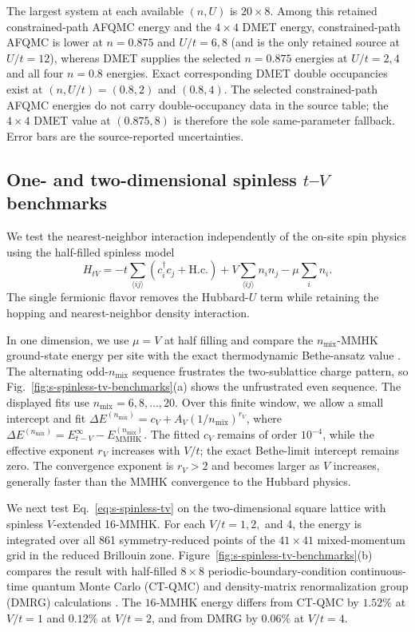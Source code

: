 \documentclass[10pt]{article}
\newcommand{\nmix}{n_{\mathrm{mix}}}
\begin{document}
The largest system at each available $(n,U)$ is $20\times8$. Among this retained
constrained-path AFQMC energy and the $4\times4$ DMET energy, constrained-path AFQMC is lower at
$n=0.875$ and $U/t=6,8$ (and is the only retained source at $U/t=12$), whereas
DMET supplies the selected $n=0.875$ energies at $U/t=2,4$ and all four
$n=0.8$ energies. Exact corresponding DMET double occupancies exist at
$(n,U/t)=(0.8,2)$ and $(0.8,4)$. The selected constrained-path AFQMC energies do not carry double-occupancy data in the source table; the $4\times4$ DMET value at $(0.875,8)$ is therefore the sole same-parameter fallback. Error bars are the source-reported uncertainties.

\subsection{One- and two-dimensional spinless $t$--$V$ benchmarks}
We test the nearest-neighbor interaction independently of the on-site spin physics using the half-filled spinless model
\begin{equation}
 H_{tV}=-t\sum_{\langle ij\rangle}\left(c_i^\dagger c_j+\mathrm{H.c.}\right)
 +V\sum_{\langle ij\rangle}n_i n_j-\mu\sum_i n_i .
 \label{eq:s-spinless-tv}
\end{equation}
The single fermionic flavor removes the Hubbard-$U$ term while retaining the hopping and nearest-neighbor density interaction.

In one dimension, we use $\mu=V$ at half filling and compare the $\nmix$-MMHK ground-state energy per site with the exact thermodynamic Bethe-ansatz value \cite{yang1966xxzenergy}. The alternating odd-$\nmix$ sequence frustrates the two-sublattice charge pattern, so Fig.~\ref{fig:s-spinless-tv-benchmarks}(a) shows the unfrustrated even sequence. The displayed fits use $\nmix=6,8,\ldots,20$. Over this finite window, we allow a small intercept and fit $\Delta E^{(\nmix)}=c_V+A_V(1/\nmix)^{r_V}$, where $\Delta E^{(\nmix)}=E_{t-V}^{\infty}-E_{\mathrm{MMHK}}^{(\nmix)}$. The fitted $c_V$ remains of order $10^{-4}$, while the effective exponent $r_V$ increases with $V/t$; the exact Bethe-limit intercept remains zero. The convergence exponent is $r_V>2$ and becomes larger as $V$ increases, generally faster than the MMHK convergence to the Hubbard physics\cite{mai2026twisting}. 

We next test Eq.~\ref{eq:s-spinless-tv} on the two-dimensional square lattice with spinless $V$-extended 16-MMHK. For each $V/t=1,2,$ and 4, the energy is integrated over all 861 symmetry-reduced points of the $41\times41$ mixed-momentum grid in the reduced Brillouin zone. Figure~\ref{fig:s-spinless-tv-benchmarks}(b) compares the result with half-filled $8\times8$ periodic-boundary-condition continuous-time quantum Monte Carlo (CT-QMC) and density-matrix renormalization group (DMRG) calculations \cite{wu2024variational,wang2016stochastic}. The $16$-MMHK energy differs from CT-QMC by $1.52\%$ at $V/t=1$ and $0.12\%$ at $V/t=2$, and from DMRG by $0.06\%$ at $V/t=4$.
\end{document}
